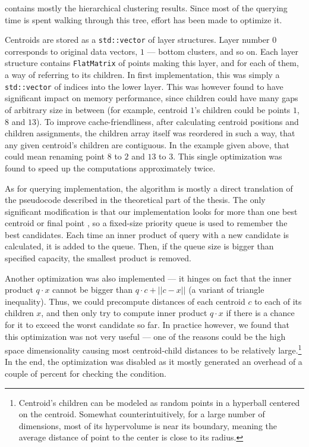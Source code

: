  contains mostly the hierarchical clustering results.
Since most of the querying time is spent walking through this tree, effort has been made
to optimize it.

Centroids are stored as a \texttt{std::vector} of layer structures. Layer number $0$ corresponds
to original data vectors, $1$ --- bottom clusters, and so on. Each layer structure contains
\texttt{FlatMatrix} of points making this layer, and for each of them, a way of referring to
its children. In first implementation, this was simply a \texttt{std::vector} of indices into
the lower layer. This was however found to have significant impact on memory performance,
since children could have many gaps of arbitrary size in between (for example, centroid
$1$'s children could be points $1$, $8$ and $13$). To improve cache-friendliness, after
calculating centroid positions and children assignments, the children array itself was 
reordered in such a way, that any given centroid's children are contiguous. In the example
given above, that could mean renaming point $8$ to $2$ and $13$ to $3$. This single
optimization was found to speed up the computations approximately twice.

As for querying implementation, the algorithm is mostly a direct translation of the pseudocode
described in the theoretical part of the thesis. The only significant modification is 
that our implementation looks for more than one best centroid or final point , so a
fixed-size priority queue is used to remember the best candidates. Each time an inner
product of query with a new candidate is calculated, it is added to the queue.
Then, if the queue size is bigger than specified capacity, the smallest product is
removed.

Another optimization was also implemented --- it hinges on fact that the inner product
$q \cdot x$ cannot be bigger than $q \cdot c + ||c - x||$ (a variant of triangle inequality).
Thus, we could precompute distances of each centroid $c$ to each of its children $x$,
and then only try to compute inner product $q \cdot x$ if there is a chance for 
it to exceed the worst candidate so far. In practice however, we found that this
optimization was not very useful --- one of the reasons could be the high space
dimensionality causing most centroid-child distances to be relatively large.\footnote{
Centroid's children can be modeled as random points in a hyperball centered on the
centroid. Somewhat counterintuitively, for a large number of dimensions, 
most of its hypervolume is near its boundary, meaning the average distance of point
to the center is close to its radius.
} In the end, the optimization was disabled as it mostly generated an overhead of a
couple of percent for checking the condition.
